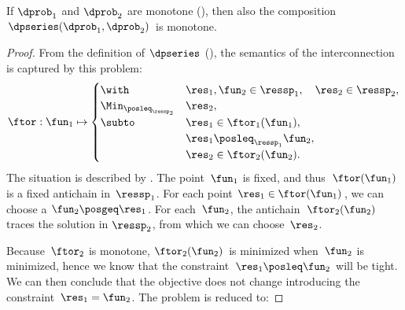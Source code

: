 \begin{prop}
\label{pro:series-monotone}If $\dprob_{1}$ and $\dprob_{2}$ are
monotone (), then also the composition $\dpseries(\dprob_{1},\dprob_{2})$
is monotone.
\end{prop}
\begin{proof}
From the definition of $\dpseries$ (),
the semantics of the interconnection is captured by this problem:
\begin{equation}
\ftor:\fun_{1}\mapsto\begin{cases}
\with & \res_{1},\fun_{2}\in\ressp_{1},\quad\res_{2}\in\ressp_{2},\\
\Min_{\posleq_{\ressp_{2}}} & \res_{2},\\
\subto & \res_{1}\in\ftor_{1}(\fun_{1}),\\
 & \res_{1}\posleq_{\ressp_{1}}\fun_{2},\\
 & \res_{2}\in\ftor_{2}(\fun_{2}).
\end{cases}\label{eq:dede}
\end{equation}
The situation is described by . The point~$\fun_{1}$
is fixed, and thus~$\ftor(\fun_{1})$ is a fixed antichain in~$\ressp_{1}$.
For each point $\res_{1}\in\ftor(\fun_{1})$, we can choose a $\fun_{2}\posgeq\res_{1}$.
For each~$\fun_{2}$, the antichain~$\ftor_{2}(\fun_{2})$ traces
the solution in $\ressp_{2}$, from which we can choose~$\res_{2}$. 


\noindent Because~$\ftor_{2}$ is monotone, $\ftor_{2}(\fun_{2})$
is minimized when~$\fun_{2}$ is minimized, hence we know that the
constraint~$\res_{1}\posleq\fun_{2}$ will be tight. We can then
conclude that the objective does not change introducing the constraint~$\res_{1}=\fun_{2}$.
The problem is reduced to:


\end{proof}
